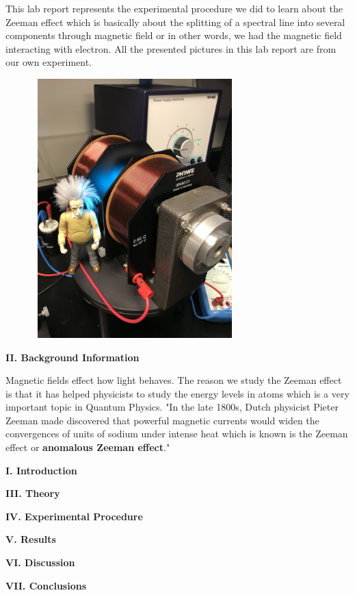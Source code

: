 \documentclass[fleqn]{article}
\begin{document}
  This lab report represents the experimental procedure we did to learn about the Zeeman effect which is basically about 
  the splitting of a spectral line into several components through magnetic field or in other words, we had the magnetic field 
  interacting with electron. All the presented pictures in this lab report are from our own experiment.
  \vspace{10px}

  \includegraphics[height=10cm, width=10cm]{1.jpg}

  \vspace{20px}

  \textbf{II. Background Information}

  \vspace{10px}

  Magnetic fields effect how light behaves. The reason we study the Zeeman effect is that it has helped physicists to study the energy levels
  in atoms which is a very important topic in Quantum Physics.
  "In the late 1800s, Dutch physicist Pieter Zeeman made discovered that powerful magnetic currents would widen the convergences of units 
  of sodium under intense heat which is known is the Zeeman effect or \textbf{anomalous Zeeman effect}." \textcite{One}

  \vspace{20px}

  \textbf{I. Introduction}

  \vspace{10px}

  \textbf{III. Theory}

  \textbf{IV. Experimental Procedure}

  \textbf{V. Results}

  \textbf{VI. Discussion}

  \textbf{VII. Conclusions}

  \printbibliography
\end{document}
